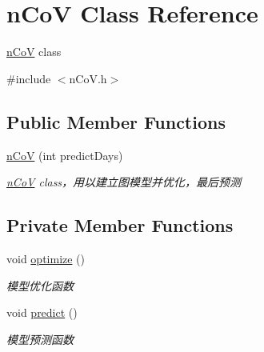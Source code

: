 \hypertarget{classnCoV}{}\section{n\+CoV Class Reference}
\label{classnCoV}


\hyperlink{classnCoV}{n\+CoV} class  




{\ttfamily \#include $<$n\+Co\+V.\+h$>$}

\subsection*{Public Member Functions}
\begin{DoxyCompactItemize}
\item 
\hyperlink{classnCoV_a30d4a90c5f401cf6943e104ec737dc48}{n\+CoV} (int predict\+Days)
\begin{DoxyCompactList}\small\item\em \hyperlink{classnCoV}{n\+CoV} class，用以建立图模型并优化，最后预测 \end{DoxyCompactList}\end{DoxyCompactItemize}
\subsection*{Private Member Functions}
\begin{DoxyCompactItemize}
\item 
void \hyperlink{classnCoV_acf5ddd73cab8522622b2602258507c08}{optimize} ()
\begin{DoxyCompactList}\small\item\em 模型优化函数 \end{DoxyCompactList}\item 
void \hyperlink{classnCoV_a5a0b30d27da271601d45c144c6a3da2d}{predict} ()
\begin{DoxyCompactList}\small\item\em 模型预测函数 \end{DoxyCompactList}\end{DoxyCompactItemize}
